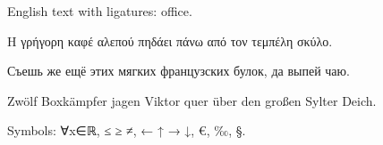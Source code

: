 \documentclass{article}
\begin{document}
English text with ligatures: office.
\begin{greek}Η γρήγορη καφέ αλεπού πηδάει πάνω από τον τεμπέλη σκύλο.\end{greek}
\begin{russian}Съешь же ещё этих мягких французских булок, да выпей чаю.\end{russian}
\begin{german}Zwölf Boxkämpfer jagen Viktor quer über den großen Sylter Deich.\end{german}
Symbols: ∀x∈ℝ, ≤ ≥ ≠, ← ↑ → ↓, €, ‰, §.
\end{document}
